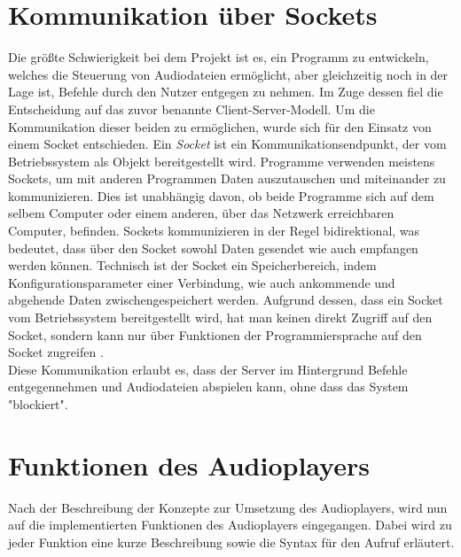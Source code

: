 \section{Kommunikation über Sockets}
Die größte Schwierigkeit bei dem Projekt ist es, ein Programm zu entwickeln,
welches die Steuerung von Audiodateien ermöglicht, aber gleichzeitig noch in
der Lage ist, Befehle durch den Nutzer entgegen zu nehmen. Im Zuge dessen
fiel die Entscheidung auf das zuvor benannte
Client-Server-Modell. Um die Kommunikation dieser beiden zu ermöglichen, wurde
sich für den Einsatz von einem Socket entschieden. \newline
Ein \textit{Socket} ist ein Kommunikationsendpunkt, der vom Betriebssystem als
Objekt bereitgestellt wird. Programme verwenden meistens Sockets, um mit anderen
Programmen Daten auszutauschen und miteinander zu kommunizieren. Dies ist
unabhängig davon, ob beide Programme sich auf dem selbem Computer oder einem
anderen, über das Netzwerk erreichbaren Computer, befinden. Sockets
kommunizieren in der Regel bidirektional, was bedeutet, dass über den Socket
sowohl Daten gesendet wie auch empfangen werden können. Technisch ist der
Socket ein Speicherbereich, indem Konfigurationsparameter einer Verbindung, wie
auch ankommende und abgehende Daten zwischengespeichert werden. Aufgrund
dessen, dass ein Socket vom Betriebssystem bereitgestellt wird, hat man keinen
direkt Zugriff auf den Socket, sondern kann nur über Funktionen der
Programmiersprache auf den Socket zugreifen \autocite{pollakowski_2012}. \\
Diese Kommunikation erlaubt es, dass der Server im Hintergrund Befehle entgegennehmen und
Audiodateien abspielen kann, ohne dass das System "blockiert". 

\section{Funktionen des Audioplayers}
Nach der Beschreibung der Konzepte zur Umsetzung des Audioplayers, 
wird nun auf die implementierten Funktionen des Audioplayers eingegangen. Dabei wird
zu jeder Funktion eine kurze Beschreibung sowie die Syntax für den Aufruf
erläutert.


